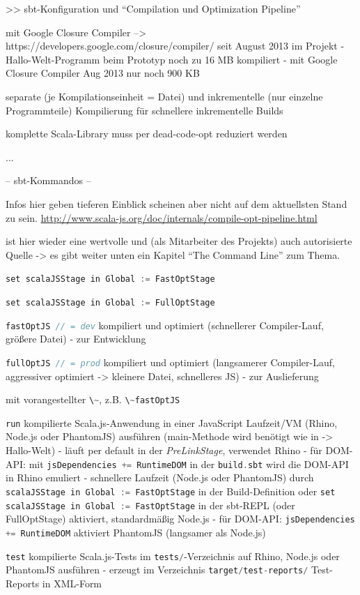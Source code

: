 \documentclass[a4paper, 12pt, hidelinks, listof=totoc, listoftables=totoc, bibliography=totoc]{scrreprt}
\newcommand{\code}[1]{\lstinline[language=Scala, style=inline]|#1|}
\begin{document}
>> sbt-Konfiguration und "`Compilation und Optimization Pipeline"'

mit Google Closure Compiler  -->  https://developers.google.com/closure/compiler/
	seit August 2013 im Projekt
	- Hallo-Welt-Programm beim Prototyp noch zu 16 MB kompiliert
	- mit Google Closure Compiler Aug 2013 nur noch 900 KB

	separate (je Kompilationseinheit = Datei) und inkrementelle (nur einzelne Programmteile) Kompilierung für schnellere inkrementelle Builds
	
	komplette Scala-Library muss per dead-code-opt reduziert werden

...


-- sbt-Kommandos --

Infos hier geben tieferen Einblick scheinen aber nicht auf dem aktuellsten Stand zu sein.
\url{http://www.scala-js.org/doc/internals/compile-opt-pipeline.html}

\cite[\#TheCommandLine]{haoyi.HOS} ist hier wieder eine wertvolle und (als Mitarbeiter des Projekts) auch autorisierte Quelle -> es gibt weiter unten ein Kapitel "`The Command Line"' zum Thema.

\code{set scalaJSStage in Global := FastOptStage}

\code{set scalaJSStage in Global := FullOptStage}


\code{fastOptJS // = dev} kompiliert und optimiert (schnellerer Compiler-Lauf, größere Datei) - zur Entwicklung

\code{fullOptJS // = prod} kompiliert und optimiert (langsamerer Compiler-Lauf, aggressiver optimiert -> kleinere Datei, schnelleres JS) - zur Auslieferung

mit vorangestellter  \code{\~}, z.B. \code{\~fastOptJS}

\code{run} kompilierte Scala.js-Anwendung in einer JavaScript Laufzeit/VM (Rhino, Node.js oder PhantomJS) ausführen (main-Methode wird benötigt wie in -> Hallo-Welt)
	- läuft per default in der \textit{PreLinkStage}, verwendet Rhino
		- für DOM-API: mit \code{jsDependencies += RuntimeDOM} in der \code{build.sbt} wird die DOM-API in Rhino emuliert
	- schnellere Laufzeit (Node.js oder PhantomJS) durch \code{scalaJSStage in Global := FastOptStage} in der Build-Definition oder \code{set scalaJSStage in Global := FastOptStage} in der sbt-REPL (oder FullOptStage) aktiviert, standardmäßig Node.js
		- für DOM-API: \code{jsDependencies += RuntimeDOM} aktiviert PhantomJS (langsamer als Node.js)

\code{test} kompilierte Scala.js-Tests im \code{tests/}-Verzeichnis auf Rhino, Node.js oder PhantomJS ausführen
	- erzeugt im Verzeichnis \code{target/test-reports/} Test-Reports in XML-Form
\end{document}
